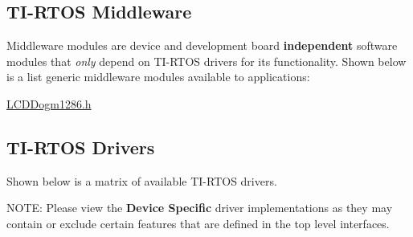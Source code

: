 \hypertarget{index_middleware}{}\subsection{T\+I-\/\+R\+T\+O\+S Middleware}\label{index_middleware}
Middleware modules are device and development board {\bfseries independent} software modules that {\itshape only} depend on T\+I-\/\+R\+T\+O\+S drivers for its functionality. Shown below is a list generic middleware modules available to applications\+:
\begin{DoxyItemize}
\item \hyperlink{_l_c_d_dogm1286_8h}{L\+C\+D\+Dogm1286.\+h}
\end{DoxyItemize}\hypertarget{index_drivers}{}\subsection{T\+I-\/\+R\+T\+O\+S Drivers}\label{index_drivers}
Shown below is a matrix of available T\+I-\/\+R\+T\+O\+S drivers.

N\+O\+T\+E\+: Please view the {\bfseries Device Specific} driver implementations as they may contain or exclude certain features that are defined in the top level interfaces.

